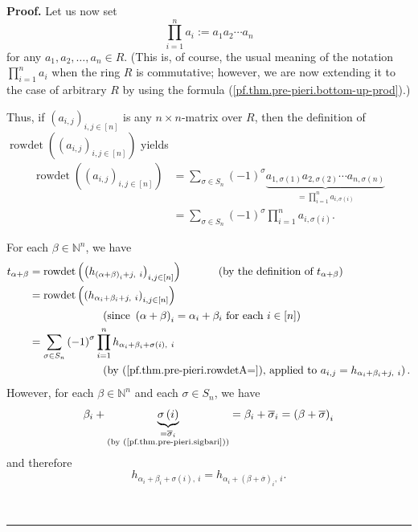 \documentclass
[numbers=enddot,12pt,final,onecolumn,notitlepage,english]{scrartcl}%
\theoremstyle{definition}
\newenvironment{proof}[1][Proof]{\noindent\textbf{#1.} }{\ \rule{0.5em}{0.5em}}
\let\sumnonlimits\sum
\let\prodnonlimits\prod
\renewcommand{\sum}{\sumnonlimits\limits}
\renewcommand{\prod}{\prodnonlimits\limits}
\newenvironment{verlong}{}{}
\begin{document}
\begin{verlong}
\begin{proof}
Let us now set%
\begin{equation}
\prod_{i=1}^{n}a_{i}:=a_{1}a_{2}\cdots a_{n}
\label{pf.thm.pre-pieri.bottom-up-prod}%
\end{equation}
for any $a_{1},a_{2},\ldots,a_{n}\in R$. (This is, of course, the usual
meaning of the notation $\prod_{i=1}^{n}a_{i}$ when the ring $R$ is
commutative; however, we are now extending it to the case of arbitrary $R$ by
using the formula (\ref{pf.thm.pre-pieri.bottom-up-prod}).)

Thus, if $\left(  a_{i,j}\right)  _{i,j\in\left[  n\right]  }$ is any $n\times
n$-matrix over $R$, then the definition of $\operatorname*{rowdet}\left(
\left(  a_{i,j}\right)  _{i,j\in\left[  n\right]  }\right)  $ yields%
\begin{align}
\operatorname*{rowdet}\left(  \left(  a_{i,j}\right)  _{i,j\in\left[
n\right]  }\right)   &  =\sum_{\sigma\in S_{n}}\left(  -1\right)  ^{\sigma
}\underbrace{a_{1,\sigma\left(  1\right)  }a_{2,\sigma\left(  2\right)
}\cdots a_{n,\sigma\left(  n\right)  }}_{=\prod_{i=1}^{n}a_{i,\sigma\left(
i\right)  }}\nonumber\\
&  =\sum_{\sigma\in S_{n}}\left(  -1\right)  ^{\sigma}\prod_{i=1}%
^{n}a_{i,\sigma\left(  i\right)  }. \label{pf.thm.pre-pieri.rowdetA=}%
\end{align}


For each $\beta\in\mathbb{N}^{n}$, we have%
\begin{align}
t_{\alpha+\beta}  &  =\operatorname*{rowdet}\left(  \left(  h_{\left(
\alpha+\beta\right)  _{i}+j,\ i}\right)  _{i,j\in\left[  n\right]  }\right)
\ \ \ \ \ \ \ \ \ \ \left(  \text{by the definition of }t_{\alpha+\beta
}\right) \nonumber\\
&  =\operatorname*{rowdet}\left(  \left(  h_{\alpha_{i}+\beta_{i}%
+j,\ i}\right)  _{i,j\in\left[  n\right]  }\right) \nonumber\\
&  \ \ \ \ \ \ \ \ \ \ \ \ \ \ \ \ \ \ \ \ \left(  \text{since }\left(
\alpha+\beta\right)  _{i}=\alpha_{i}+\beta_{i}\text{ for each }i\in\left[
n\right]  \right) \nonumber\\
&  =\sum_{\sigma\in S_{n}}\left(  -1\right)  ^{\sigma}\prod_{i=1}^{n}%
h_{\alpha_{i}+\beta_{i}+\sigma\left(  i\right)  ,\ i}%
\label{pf.thm.pre-pieri.t1}\\
&  \ \ \ \ \ \ \ \ \ \ \ \ \ \ \ \ \ \ \ \ \left(  \text{by
(\ref{pf.thm.pre-pieri.rowdetA=}), applied to }a_{i,j}=h_{\alpha_{i}+\beta
_{i}+j,\ i}\right)  .\nonumber
\end{align}
However, for each $\beta\in\mathbb{N}^{n}$ and each $\sigma\in S_{n}$, we have%
\[
\beta_{i}+\underbrace{\sigma\left(  i\right)  }_{\substack{=\overline{\sigma
}_{i}\\\text{(by (\ref{pf.thm.pre-pieri.sigbari}))}}}=\beta_{i}+\overline
{\sigma}_{i}=\left(  \beta+\overline{\sigma}\right)  _{i}%
\]
and therefore%
\begin{equation}
h_{\alpha_{i}+\beta_{i}+\sigma\left(  i\right)  ,\ i}=h_{\alpha_{i}+\left(
\beta+\overline{\sigma}\right)  _{i},\ i}. \label{pf.thm.pre-pieri.h=h1}%
\end{equation}



\end{proof}
\end{verlong}
\end{document}
